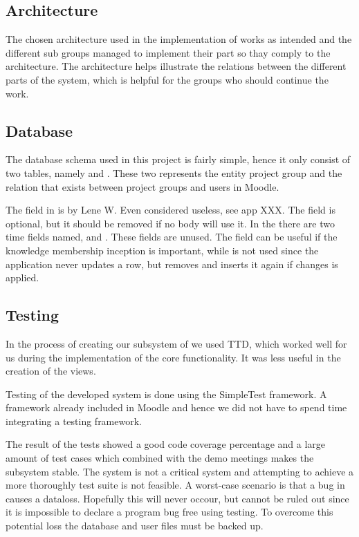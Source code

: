 \subsection{Architecture}
The chosen architecture used in the implementation of \system{} works as intended and the different sub groups managed to implement their part so thay comply to the architecture. 
The architecture helps illustrate the relations between the different parts of the system, which is helpful for the groups who should continue the work. 




\subsection{Database}
The database schema used in this project is fairly simple, hence it only consist of two tables, namely   and . 
These two represents the entity project group and the relation that exists between project groups and users in Moodle. 

The  field in  is by Lene W. Even considered useless, see app XXX. 
The field is optional, but it should be removed if no body will use it. 
In the  there are two time fields named,  and . 
These fields are unused. 
The field  can be useful if the knowledge membership inception is important, while  is not used since the application never updates a row, but removes and inserts it again if changes is applied. 



\subsection{Testing}
In the process of creating our subsystem of \system{} we used TTD, which worked well for us during the implementation of the core functionality. 
It was less useful in the creation of the views. 

Testing of the developed system is done using the SimpleTest framework. 
A framework already included in Moodle and hence we did not have to spend time integrating a testing framework.

The result of the tests showed a good code coverage percentage and a large amount of test cases which combined with the demo meetings makes the subsystem stable. 
The system is not a critical system and attempting to achieve a more thoroughly test suite is not feasible. 
A worst-case scenario is that a bug in \system{} causes a dataloss. 
Hopefully this will never occour, but cannot be ruled out since it is impossible to declare a program bug free using testing.
To overcome this potential loss the database and user files must be backed up.
